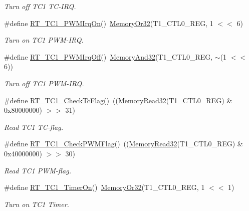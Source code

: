 \begin{DoxyCompactItemize}
\begin{DoxyCompactList}\small\item\em Turn off T\+C1 T\+C-\/\+I\+RQ. \end{DoxyCompactList}\item 
\#define \mbox{\hyperlink{a00044_a61477182241a8629176801cca44ce09a}{R\+T\+\_\+\+T\+C1\+\_\+\+P\+W\+M\+Irq\+On}}()~\mbox{\hyperlink{a00020_a9ea92ebccdef6bdaca4d00210cc7266d}{Memory\+Or32}}(T1\+\_\+\+C\+T\+L0\+\_\+\+R\+EG, 1 $<$$<$ 6)
\begin{DoxyCompactList}\small\item\em Turn on T\+C1 P\+W\+M-\/\+I\+RQ. \end{DoxyCompactList}\item 
\#define \mbox{\hyperlink{a00044_a1c33903adfe470964d7eb5126c4ce7d4}{R\+T\+\_\+\+T\+C1\+\_\+\+P\+W\+M\+Irq\+Off}}()~\mbox{\hyperlink{a00020_a5c1a2bd4c1bd4c2f429d8042a45327ff}{Memory\+And32}}(T1\+\_\+\+C\+T\+L0\+\_\+\+R\+EG, $\sim$(1 $<$$<$ 6))
\begin{DoxyCompactList}\small\item\em Turn off T\+C1 P\+W\+M-\/\+I\+RQ. \end{DoxyCompactList}\item 
\#define \mbox{\hyperlink{a00044_a3395d62010d1ca815676f3086f0dfb4a}{R\+T\+\_\+\+T\+C1\+\_\+\+Check\+Tc\+Flag}}()~((\mbox{\hyperlink{a00020_a706b02571285f92589fbb0b964d7d0bb}{Memory\+Read32}}(T1\+\_\+\+C\+T\+L0\+\_\+\+R\+EG) \& 0x80000000) $>$$>$ 31)
\begin{DoxyCompactList}\small\item\em Read T\+C1 T\+C-\/flag. \end{DoxyCompactList}\item 
\#define \mbox{\hyperlink{a00044_acf0b6d73b626b9f56f9f6fda79d0860c}{R\+T\+\_\+\+T\+C1\+\_\+\+Check\+P\+W\+M\+Flag}}()~((\mbox{\hyperlink{a00020_a706b02571285f92589fbb0b964d7d0bb}{Memory\+Read32}}(T1\+\_\+\+C\+T\+L0\+\_\+\+R\+EG) \& 0x40000000) $>$$>$ 30)
\begin{DoxyCompactList}\small\item\em Read T\+C1 P\+W\+M-\/flag. \end{DoxyCompactList}\item 
\#define \mbox{\hyperlink{a00044_ac76393581e0b1d58a9628139db72cdaf}{R\+T\+\_\+\+T\+C1\+\_\+\+Timer\+On}}()~\mbox{\hyperlink{a00020_a9ea92ebccdef6bdaca4d00210cc7266d}{Memory\+Or32}}(T1\+\_\+\+C\+T\+L0\+\_\+\+R\+EG, 1 $<$$<$ 1)
\begin{DoxyCompactList}\small\item\em Turn on T\+C1 Timer. \end{DoxyCompactList}\item 
$$
\end{DoxyCompactItemize}
